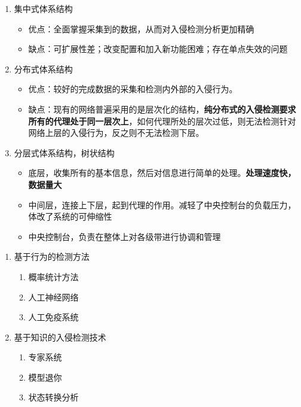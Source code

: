 \begin{enumerate}
	\item 集中式体系结构
	\begin{itemize}
		\item 优点：全面掌握采集到的数据，从而对入侵检测分析更加精确
		\item 缺点：可扩展性差；改变配置和加入新功能困难；存在单点失效的问题
	\end{itemize}
	\item 分布式体系结构
	\begin{itemize}
		\item 优点：较好的完成数据的采集和检测内外部的入侵行为。
		\item 缺点：现有的网络普遍采用的是层次化的结构，\textbf{纯分布式的入侵检测要求所有的代理处于同一层次上}，如何代理所处的层次过低，则无法检测针对网络上层的入侵行为，反之则不无法检测下层。
	\end{itemize}
	\item 分层式体系结构，树状结构
	\begin{itemize}
		\item 底层，收集所有的基本信息，然后对信息进行简单的处理。\textbf{处理速度快，数据量大}
		\item 中间层，连接上下层，起到代理的作用。减轻了中央控制台的负载压力，体改了系统的可伸缩性
		\item 中央控制台，负责在整体上对各级带进行协调和管理
	\end{itemize}
\end{enumerate}

\begin{enumerate}
	\item 基于行为的检测方法
	\begin{enumerate}
		\item 概率统计方法
		\item 人工神经网络
		\item 人工免疫系统
	\end{enumerate}
	\item 基于知识的入侵检测技术
	\begin{enumerate}
		\item 专家系统
		\item 模型退你
		\item 状态转换分析
	\end{enumerate}
\end{enumerate}

